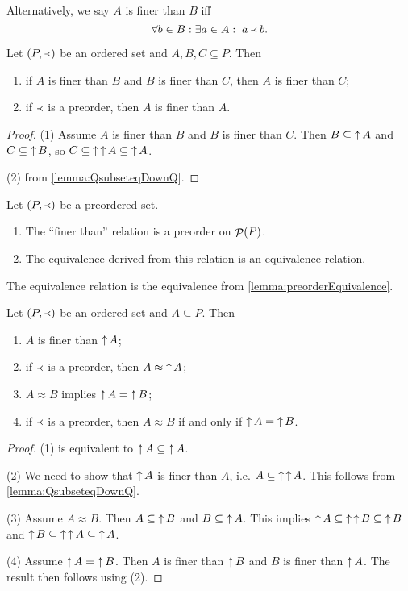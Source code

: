 Alternatively, we say $A$ is finer than $B$ iff
\[ \forall b\in B: \exists a\in A: \; a \Yleft b. \]

\begin{lemma}
Let $\left( P,\Yleft \right)$ be an ordered set and $A,B,C \subseteq P$. Then
\begin{enumerate}
\item if $A$ is finer than $B$ and $B$ is finer than $C$, then $A$ is finer than $C$;
\item if $\Yleft$ is a preorder, then $A$ is finer than $A$.
\end{enumerate}
\end{lemma}
\begin{proof}
(1) Assume $A$ is finer than $B$ and $B$ is finer than $C$. Then $B \subseteq \mathop{\uparrow} A$ and $C\subseteq \mathop{\uparrow} B$, so $C \subseteq \mathop{\uparrow}\mathop{\uparrow} A \subseteq \mathop{\uparrow} A$.

(2) from \ref{lemma:QsubseteqDownQ}.
\end{proof}
\begin{corollary}
Let $\left( P,\Yleft \right)$ be a preordered set.
\begin{enumerate}
\item The ``finer than'' relation is a preorder on $\mathop{\mathcal{P}}(P)$.
\item The equivalence derived from this relation is an equivalence relation.
\end{enumerate}
\end{corollary}
The equivalence relation is the equivalence from \ref{lemma:preorderEquivalence}.

\begin{lemma}
Let $\left( P,\Yleft \right)$ be an ordered set and $A \subseteq P$. Then
\begin{enumerate}
\item $A$ is finer than $\mathop{\uparrow} A$;
\item if $\Yleft$ is a preorder, then $A \approx \mathop{\uparrow} A$;
\item $A \approx B$ implies $\mathop{\uparrow} A = \mathop{\uparrow} B$;
\item if $\Yleft$ is a preorder, then $A \approx B$ \textup{if and only if} $\mathop{\uparrow} A = \mathop{\uparrow} B$.
\end{enumerate}
\end{lemma}
\begin{proof}
(1) is equivalent to $\mathop{\uparrow} A \subseteq \mathop{\uparrow} A$.

(2) We need to show that $\mathop{\uparrow} A$ is finer than $A$, i.e. $A\subseteq \mathop{\uparrow}\mathop{\uparrow} A$. This follows from \ref{lemma:QsubseteqDownQ}.

(3) Assume $A \approx B$. Then $A \subseteq \mathop{\uparrow} B$ and $B \subseteq \mathop{\uparrow} A$. This implies $\mathop{\uparrow} A \subseteq \mathop{\uparrow}\mathop{\uparrow} B \subseteq \mathop{\uparrow} B$ and $\mathop{\uparrow} B \subseteq \mathop{\uparrow}\mathop{\uparrow} A \subseteq \mathop{\uparrow} A$.

(4) Assume $\mathop{\uparrow} A = \mathop{\uparrow} B$. Then $A$ is finer than $\mathop{\uparrow} B$ and $B$ is finer than $\mathop{\uparrow} A$. The result then follows using (2).
\end{proof}


